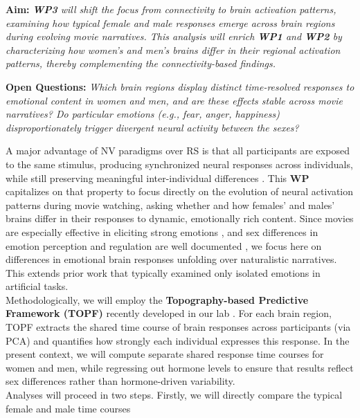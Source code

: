 \documentclass[11pt,a4paper]{article}
\begin{document}
\textbf{Aim:} \textit{\textbf{WP3} will shift the focus from connectivity to brain activation patterns, examining how typical 
female and male responses emerge across brain regions during evolving movie narratives. This analysis will enrich \textbf{WP1} 
and \textbf{WP2}  by characterizing how women's and men's brains differ in their regional activation patterns, 
thereby complementing the connectivity-based findings.}

\textbf{Open Questions:} \textit{Which brain regions display distinct time-resolved responses to emotional content in 
women and men, and are these effects stable across movie narratives? Do particular emotions (e.g., fear, anger, happiness) 
disproportionately trigger divergent neural activity between the sexes?}

A major advantage of NV paradigms over RS is that all participants are exposed to the same stimulus, 
producing synchronized neural responses across individuals, while still preserving meaningful inter-individual 
differences \parencite{finnIdiosynchronySharedResponses2020a,vanderwalIndividualDifferencesFunctional2017}. 
This \textbf{WP} capitalizes on that property to focus directly on the evolution of neural activation patterns 
during movie watching, asking whether and how females' and males' brains differ in their responses 
to dynamic, emotionally rich content. Since movies are especially effective in eliciting 
strong emotions \parencite{grossEmotionElicitationUsing1995,westermannRelativeEffectivenessValidity1996}, 
and sex differences in emotion perception and regulation are well documented 
\parencite{domesNeuralCorrelatesSex2010a,gardenerSexDifferencesEmotion2013a}, 
we focus here on differences in emotional brain responses unfolding over naturalistic narratives. 
This extends prior work that typically examined only isolated emotions in artificial tasks.\\  
Methodologically, we will employ the \textbf{Topography-based Predictive Framework (TOPF)} recently 
developed in our lab \parencite{liTopographybasedPredictiveFramework2023a}. For each brain region, 
TOPF extracts the shared time course of brain responses across participants (via PCA) and quantifies how 
strongly each individual expresses this response. In the present context, we will compute separate 
shared response time courses for women and men, while regressing out hormone levels to ensure that 
results reflect sex differences rather than hormone-driven variability.\\ 
Analyses will proceed in two steps. Firstly, we will directly compare the typical female and male time courses 
\end{document}

